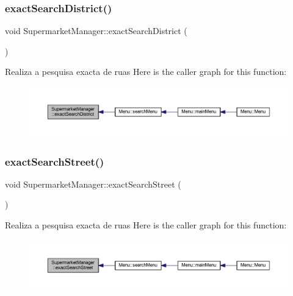 \subsubsection{\texorpdfstring{exact\+Search\+District()}{exactSearchDistrict()}}
{\footnotesize\ttfamily void Supermarket\+Manager\+::exact\+Search\+District (\begin{DoxyParamCaption}{ }\end{DoxyParamCaption})}

Realiza a pesquisa exacta de ruas Here is the caller graph for this function\+:
\nopagebreak
\begin{figure}[H]
\begin{center}
\leavevmode
\includegraphics[width=350pt]{class_supermarket_manager_addbb66cfbe7d097687595c38e16b9c62_icgraph}
\end{center}
\end{figure}
\mbox{\label{class_supermarket_manager_a7fa00d7adf078ca864908c901371a60c}} 
\subsubsection{\texorpdfstring{exact\+Search\+Street()}{exactSearchStreet()}}
{\footnotesize\ttfamily void Supermarket\+Manager\+::exact\+Search\+Street (\begin{DoxyParamCaption}{ }\end{DoxyParamCaption})}

Realiza a pesquisa exacta de ruas Here is the caller graph for this function\+:
\nopagebreak
\begin{figure}[H]
\begin{center}
\leavevmode
\includegraphics[width=350pt]{class_supermarket_manager_a7fa00d7adf078ca864908c901371a60c_icgraph}
\end{center}
\end{figure}
\mbox{\label{class_supermarket_manager_a9841cd0c676abc1f128a68bb71bc2683}} 

